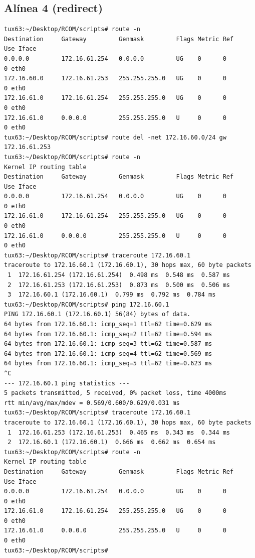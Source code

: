 \documentclass[11pt,a4paper,reqno]{report}
\numberwithin{equation}{section}
\begin{document}
\begin{appendices}
\subsection{Alínea 4 (redirect)}
\label{ex4_redirect}
\begin{lstlisting}[frame=single]
tux63:~/Desktop/RCOM/scripts# route -n
Destination     Gateway         Genmask         Flags Metric Ref    Use Iface
0.0.0.0         172.16.61.254   0.0.0.0         UG    0      0        0 eth0
172.16.60.0     172.16.61.253   255.255.255.0   UG    0      0        0 eth0
172.16.61.0     172.16.61.254   255.255.255.0   UG    0      0        0 eth0
172.16.61.0     0.0.0.0         255.255.255.0   U     0      0        0 eth0
tux63:~/Desktop/RCOM/scripts# route del -net 172.16.60.0/24 gw 172.16.61.253
tux63:~/Desktop/RCOM/scripts# route -n
Kernel IP routing table
Destination     Gateway         Genmask         Flags Metric Ref    Use Iface
0.0.0.0         172.16.61.254   0.0.0.0         UG    0      0        0 eth0
172.16.61.0     172.16.61.254   255.255.255.0   UG    0      0        0 eth0
172.16.61.0     0.0.0.0         255.255.255.0   U     0      0        0 eth0
tux63:~/Desktop/RCOM/scripts# traceroute 172.16.60.1
traceroute to 172.16.60.1 (172.16.60.1), 30 hops max, 60 byte packets
 1  172.16.61.254 (172.16.61.254)  0.498 ms  0.548 ms  0.587 ms
 2  172.16.61.253 (172.16.61.253)  0.873 ms  0.500 ms  0.506 ms
 3  172.16.60.1 (172.16.60.1)  0.799 ms  0.792 ms  0.784 ms
tux63:~/Desktop/RCOM/scripts# ping 172.16.60.1
PING 172.16.60.1 (172.16.60.1) 56(84) bytes of data.
64 bytes from 172.16.60.1: icmp_seq=1 ttl=62 time=0.629 ms
64 bytes from 172.16.60.1: icmp_seq=2 ttl=62 time=0.594 ms
64 bytes from 172.16.60.1: icmp_seq=3 ttl=62 time=0.587 ms
64 bytes from 172.16.60.1: icmp_seq=4 ttl=62 time=0.569 ms
64 bytes from 172.16.60.1: icmp_seq=5 ttl=62 time=0.623 ms
^C
--- 172.16.60.1 ping statistics ---
5 packets transmitted, 5 received, 0% packet loss, time 4000ms
rtt min/avg/max/mdev = 0.569/0.600/0.629/0.031 ms
tux63:~/Desktop/RCOM/scripts# traceroute 172.16.60.1
traceroute to 172.16.60.1 (172.16.60.1), 30 hops max, 60 byte packets
 1  172.16.61.253 (172.16.61.253)  0.465 ms  0.343 ms  0.344 ms
 2  172.16.60.1 (172.16.60.1)  0.666 ms  0.662 ms  0.654 ms
tux63:~/Desktop/RCOM/scripts# route -n
Kernel IP routing table
Destination     Gateway         Genmask         Flags Metric Ref    Use Iface
0.0.0.0         172.16.61.254   0.0.0.0         UG    0      0        0 eth0
172.16.61.0     172.16.61.254   255.255.255.0   UG    0      0        0 eth0
172.16.61.0     0.0.0.0         255.255.255.0   U     0      0        0 eth0
tux63:~/Desktop/RCOM/scripts# 
\end{lstlisting}


\end{appendices}
\end{document}
